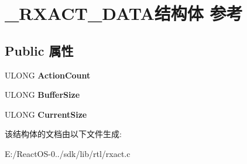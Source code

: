 \hypertarget{struct___r_x_a_c_t___d_a_t_a}{}\section{\+\_\+\+R\+X\+A\+C\+T\+\_\+\+D\+A\+T\+A结构体 参考}
\label{struct___r_x_a_c_t___d_a_t_a}
\subsection*{Public 属性}
\begin{DoxyCompactItemize}
\item 
\mbox{\label{struct___r_x_a_c_t___d_a_t_a_a4b512e13dbd3633c2426e0ea79b86775}} 
U\+L\+O\+NG {\bfseries Action\+Count}
\item 
\mbox{\label{struct___r_x_a_c_t___d_a_t_a_a09ca54a988b7f083f969c48c800d5ae2}} 
U\+L\+O\+NG {\bfseries Buffer\+Size}
\item 
\mbox{\label{struct___r_x_a_c_t___d_a_t_a_ab9db8b5399c246608ccfddc6d8b48fd5}} 
U\+L\+O\+NG {\bfseries Current\+Size}
\end{DoxyCompactItemize}


该结构体的文档由以下文件生成\+:\begin{DoxyCompactItemize}
\item 
E\+:/\+React\+O\+S-\/0../sdk/lib/rtl/rxact.\+c\end{DoxyCompactItemize}
